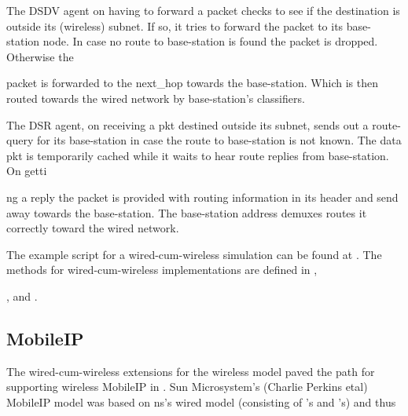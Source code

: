 {The DSDV agent on having to forward a packet checks to see if the destination is outside its (wireless) subnet. If so, it tries to forward the packet to its base-station node. In case no route to base-station is found the packet is dropped. Otherwise the 









packet is forwarded to the next\_hop towards the base-station. Which is then routed towards the wired network by base-station's classifiers.

The DSR agent, on receiving a pkt destined outside its subnet, sends out a route-query for its base-station in case the route to base-station is not known. The data pkt is temporarily cached while it waits to hear route replies from base-station. On getti









ng a reply the packet is provided with routing information in its header and send away towards the base-station. The base-station address demuxes routes it correctly toward the wired network. 

The example script for a wired-cum-wireless simulation can be found at . The methods for wired-cum-wireless implementations are defined in , 









,  and .


\subsection{MobileIP}
\label{sec:mobileip}

The wired-cum-wireless extensions for the wireless model paved the path for supporting wireless MobileIP in \ns. Sun Microsystem's (Charlie Perkins etal) MobileIP model was based on ns's wired model (consisting of 's and 's) and thus









}
